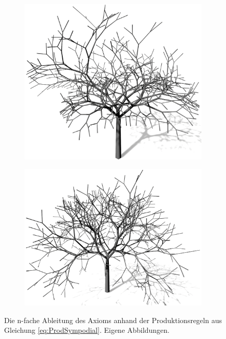 \begin{figure} [hbtp]
\begin{subfigure}[t]{.45\textwidth}
		\caption{}
		\label{subfig:LS_Sympodial_2}
	\end{subfigure}	
	\begin{subfigure}[t]{.45\textwidth}
		\centering
		\includegraphics[height=.21\textheight]{images/LS_Sympodial_3.png}
		\caption{}
		\label{subfig:LS_Sympodial_3}
	\end{subfigure}
	\begin{subfigure}[t]{.45\textwidth}
		\centering
		\includegraphics[height=.21\textheight]{images/LS_Sympodial_4.png}
		\caption{}
		\label{subfig:LS_Sympodial_4}
	\end{subfigure}
	\caption{Die n-fache Ableitung des Axioms anhand der Produktionsregeln aus Gleichung \ref{eq:ProdSympodial}. Eigene Abbildungen.}
	\label{fig:LS_Sympodial}
\end{figure}


